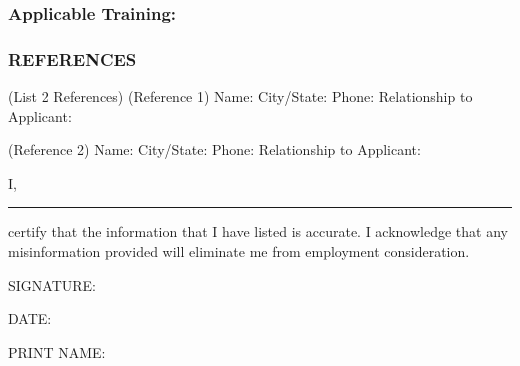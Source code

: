 \subsubsection*{Applicable Training:}



\subsubsection*{REFERENCES}
(List 2 References)
(Reference 1)
\break Name:
\break City/State:
\break Phone:
\break Relationship to Applicant:

(Reference 2)
\break Name:
\break City/State:
\break Phone:
\break Relationship to Applicant:

\break I, \rule{2cm}{1pt} certify that the information that I have listed is accurate. I acknowledge that any misinformation provided will eliminate me from employment consideration.

SIGNATURE:

DATE:

PRINT NAME:

